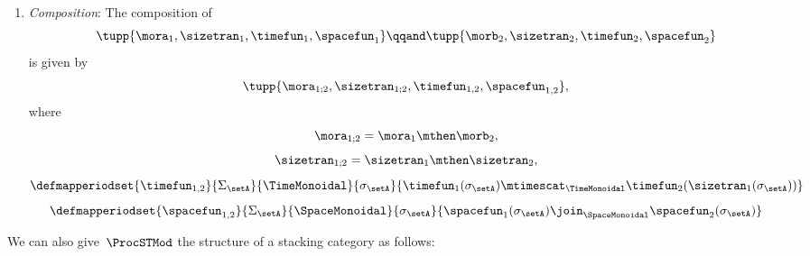 \begin{definition}
\begin{enumerate}
        \item \emph{Composition}: The composition of
              \begin{equation}
                  \tupp{\mora_1, \sizetran_1,  \timefun_1, \spacefun_1 }
                  \qqand
                  \tupp{\morb_2, \sizetran_2,  \timefun_2, \spacefun_2 }
              \end{equation}
              is given by
              \begin{equation}
                  \tupp{
                      \mora_{1;2},
                      \sizetran_{1;2},
                      \timefun_{1,2},
                      \spacefun_{1,2}
                  },
              \end{equation}
              where
              \begin{equation}
                  \mora_{1;2} = \mora_1 \mthen \morb_2,
              \end{equation}
              \begin{equation}
                  \sizetran_{1;2} = \sizetran_1 \mthen \sizetran_2,
              \end{equation}
              \begin{equation}
                  \defmapperiodset{
                      \timefun_{1,2}
                  }{
                      \Sigma_{\setA}
                  }{
                      \TimeMonoidal
                  }{
                      \sigma_{\setA}
                  }{
                      \timefun_1(\sigma_{\setA}) \mtimescat_{\TimeMonoidal} \timefun_2(\sizetran_1(\sigma_{\setA}))
                  }
              \end{equation}
              \begin{equation}
                  \defmapperiodset{
                      \spacefun_{1,2}
                  }{
                      \Sigma_{\setA}
                  }{
                      \SpaceMonoidal
                  }{
                      \sigma_{\setA}
                  }{
                      \spacefun_1(\sigma_{\setA}) \join_{\SpaceMonoidal} \spacefun_2(\sigma_{\setA})
                  }
              \end{equation}
    \end{enumerate}
\end{definition}

We can also give~$\ProcSTMod$ the structure of a stacking category as follows:


